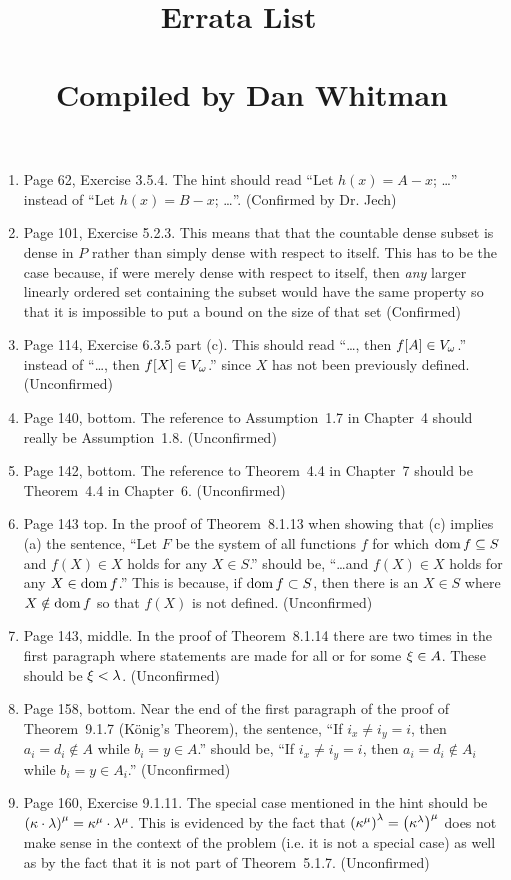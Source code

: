 \documentclass{report}
\title{
  \booktitle \\
  \ \\
  Errata List
  \ \\
  \ \\
  Compiled by Dan Whitman
}
\begin{document}
\maketitle

\begin{enumerate}

\item Page 62, Exercise 3.5.4.
  The hint should read ``Let $h(x) = A - x$; \ldots'' instead of ``Let $h(x) = B - x$; \ldots''.
  (Confirmed by Dr. Jech)

\item Page 101, Exercise 5.2.3.
  This means that that the countable dense subset is dense in $P$ rather than simply dense with respect to itself.
  This has to be the case because, if were merely dense with respect to itself, then \emph{any} larger linearly ordered set containing the subset would have the same property so that it is impossible to put a bound on the size of that set (Confirmed)

\item Page 114, Exercise 6.3.5 part (c).
  This should read ``\ldots, then $f[A] \in V_\omega$.'' instead of ``\ldots, then $f[X] \in V_\omega$.'' since $X$ has not been previously defined.
  (Unconfirmed)

\item Page 140, bottom.
  The reference to Assumption~1.7 in Chapter~4 should really be Assumption~1.8.
  (Unconfirmed)

\item Page 142, bottom.
  The reference to Theorem~4.4 in Chapter~7 should be Theorem~4.4 in Chapter~6.
  (Unconfirmed)

\item Page 143 top.
  In the proof of Theorem~8.1.13 when showing that (c) implies (a) the sentence, ``Let $F$ be the system of all functions $f$ for which $\mathrm{dom}\,{f} \subseteq S$ and $f(X) \in X$ holds for any $X \in S$.'' should be, ``\ldots and $f(X) \in X$ holds for any $X \in \mathrm{dom}\,{f}$.''
  This is because, if $\mathrm{dom}\,{f} \subset S$, then there is an $X \in S$ where $X \notin \mathrm{dom}\,{f}$ so that $f(X)$ is not defined.
  (Unconfirmed)

\item Page 143, middle.
  In the proof of Theorem~8.1.14 there are two times in the first paragraph where statements are made for all or for some $\xi \in A$.
  These should be $\xi < \lambda$.
  (Unconfirmed)

\item Page 158, bottom.
  Near the end of the first paragraph of the proof of Theorem~9.1.7 (K{\"o}nig's Theorem), the sentence, ``If $i_x \neq i_y = i$, then $a_i = d_i \notin A$ while $b_i = y \in A$.'' should be, ``If $i_x \neq i_y = i$, then $a_i = d_i \notin A_i$ while $b_i = y \in A_i$.''
  (Unconfirmed)

\item Page 160, Exercise 9.1.11.
  The special case mentioned in the hint should be $\left( \kappa \cdot \lambda \right)^\mu = \kappa^\mu \cdot \lambda^\mu$.
  This is evidenced by the fact that $\left( \kappa^\mu \right)^\lambda = \left( \kappa^\lambda \right)^\mu$ does not make sense in the context of the problem (i.e. it is not a special case) as well as by the fact that it is not part of Theorem~5.1.7.
  (Unconfirmed)

\end{enumerate}
\end{document}
